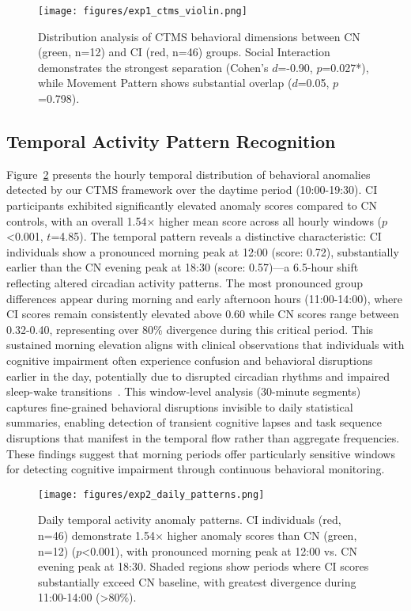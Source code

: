 \documentclass[sigconf, anonymous, 9pt, nonacm]{acmart}
\begin{document}
\begin{figure}[t]
\centering
\texttt{[image: figures/exp1\_ctms\_violin.png]}
\caption{Distribution analysis of CTMS behavioral dimensions between CN (green, n=12) and CI (red, n=46) groups. Social Interaction demonstrates the strongest separation (Cohen's $d$=-0.90, $p$=0.027*), while Movement Pattern shows substantial overlap ($d$=0.05, $p$=0.798).}
\label{fig:violin_analysis}
\vspace{-2em}
\end{figure}


\subsection{Temporal Activity Pattern Recognition}\label{subsec:temporal}

Figure~\ref{fig:temporal_patterns} presents the hourly temporal distribution of behavioral anomalies detected by our CTMS framework over the daytime period (10:00-19:30). CI participants exhibited significantly elevated anomaly scores compared to CN controls, with an overall 1.54× higher mean score across all hourly windows ($p$<0.001, $t$=4.85). 
The temporal pattern reveals a distinctive characteristic: CI individuals show a pronounced morning peak at 12:00 (score: 0.72), substantially earlier than the CN evening peak at 18:30 (score: 0.57)---a 6.5-hour shift reflecting altered circadian activity patterns. The most pronounced group differences appear during morning and early afternoon hours (11:00-14:00), where CI scores remain consistently elevated above 0.60 while CN scores range between 0.32-0.40, representing over 80\% divergence during this critical period. This sustained morning elevation aligns with clinical observations that individuals with cognitive impairment often experience confusion and behavioral disruptions earlier in the day, potentially due to disrupted circadian rhythms and impaired sleep-wake transitions~\cite{Khachiyants2011Sundown,Musiek2015Sleep}. This window-level analysis (30-minute segments) captures fine-grained behavioral disruptions invisible to daily statistical summaries, enabling detection of transient cognitive lapses and task sequence disruptions that manifest in the temporal flow rather than aggregate frequencies. These findings suggest that morning periods offer particularly sensitive windows for detecting cognitive impairment through continuous behavioral monitoring.


\begin{figure}[t]
\centering
\texttt{[image: figures/exp2\_daily\_patterns.png]}
\caption{Daily temporal activity anomaly patterns. CI individuals (red, n=46) demonstrate 1.54× higher anomaly scores than CN (green, n=12) ($p$<0.001), with pronounced morning peak at 12:00 vs. CN evening peak at 18:30. Shaded regions show periods where CI scores substantially exceed CN baseline, with greatest divergence during 11:00-14:00 (>80\%).}
\label{fig:temporal_patterns}
\vspace{-1.5em}
\end{figure}
\end{document}
